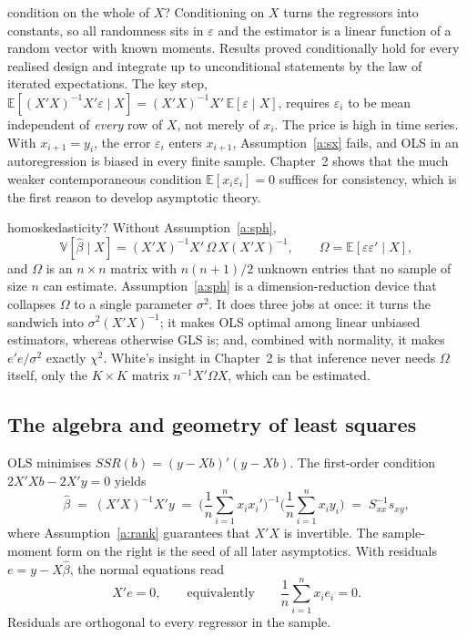 \documentclass[11pt,a4paper]{article}
\newcommand{\E}{\mathbb{E}}
\newcommand{\V}{\mathbb{V}}
\newcommand{\bh}{\hat\beta}
\newcommand{\Sxx}{S_{xx}}
\begin{document}
\begin{whybox}{condition on the whole of $X$?}
Conditioning on $X$ turns the regressors into constants, so all randomness sits in $\varepsilon$ and the estimator is a linear function of a random vector with known moments. Results proved conditionally hold for every realised design and integrate up to unconditional statements by the law of iterated expectations. The key step, $\E[(X'X)^{-1}X'\varepsilon\mid X]=(X'X)^{-1}X'\,\E[\varepsilon\mid X]$, requires $\varepsilon_i$ to be mean independent of \emph{every} row of $X$, not merely of $x_i$. The price is high in time series. With $x_{i+1}=y_i$, the error $\varepsilon_i$ enters $x_{i+1}$, Assumption~\ref{a:sx} fails, and OLS in an autoregression is biased in every finite sample. Chapter~2 shows that the much weaker contemporaneous condition $\E[x_i\varepsilon_i]=0$ suffices for consistency, which is the first reason to develop asymptotic theory.
\end{whybox}

\begin{whybox}{homoskedasticity?}
Without Assumption~\ref{a:sph},
\[
\V[\bh\mid X]=(X'X)^{-1}X'\,\Omega\, X(X'X)^{-1},\qquad \Omega=\E[\varepsilon\varepsilon'\mid X],
\]
and $\Omega$ is an $n\times n$ matrix with $n(n+1)/2$ unknown entries that no sample of size $n$ can estimate. Assumption~\ref{a:sph} is a dimension-reduction device that collapses $\Omega$ to a single parameter $\sigma^2$. It does three jobs at once: it turns the sandwich into $\sigma^2(X'X)^{-1}$; it makes OLS optimal among linear unbiased estimators, whereas otherwise GLS is; and, combined with normality, it makes $e'e/\sigma^2$ exactly $\chi^2$. White's insight in Chapter~2 is that inference never needs $\Omega$ itself, only the $K\times K$ matrix $n^{-1}X'\Omega X$, which can be estimated.
\end{whybox}

\subsection{The algebra and geometry of least squares}

OLS minimises $SSR(b)=(y-Xb)'(y-Xb)$. The first-order condition $2X'Xb-2X'y=0$ yields
\begin{equation}\label{eq:ols}
\bh \;=\; (X'X)^{-1}X'y \;=\; \Big(\frac1n\sum_{i=1}^n x_ix_i'\Big)^{-1}\Big(\frac1n\sum_{i=1}^n x_iy_i\Big) \;=\; \Sxx^{-1}s_{xy},
\end{equation}
where Assumption~\ref{a:rank} guarantees that $X'X$ is invertible. The sample-moment form on the right is the seed of all later asymptotics. With residuals $e=y-X\bh$, the normal equations read
\[
X'e = 0, \qquad\text{equivalently}\qquad \frac1n\sum_{i=1}^n x_ie_i = 0 .
\]
Residuals are orthogonal to every regressor in the sample.
\end{document}

